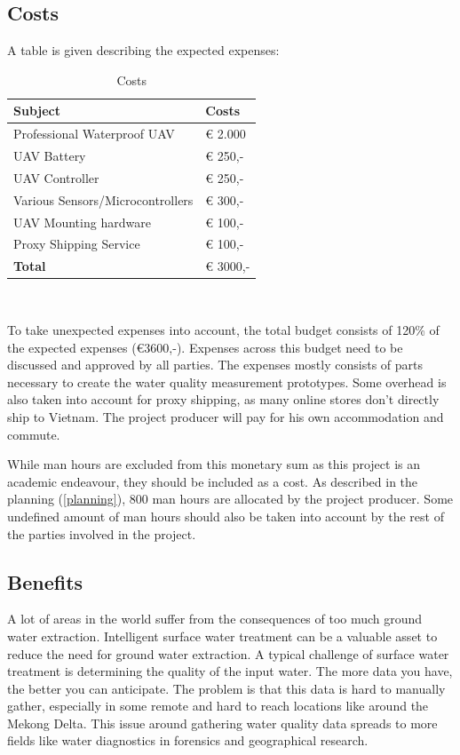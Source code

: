 \documentclass[11pt, a4paper]{article}
\begin{document}
\subsection{Costs}
A table is given describing the expected expenses:\\
\begin{table}[h]
    \centering
\begin{tabular}{ | l | l |}
    \hline
    \textbf{Subject} & \textbf{Costs} \\ \hline
    Professional Waterproof UAV & € 2.000 \\
    UAV Battery & € 250,- \\
    UAV Controller & € 250,- \\
    Various Sensors/Microcontrollers & € 300,- \\
    UAV Mounting hardware & € 100,- \\
    Proxy Shipping Service & € 100,- \\
    \hline
    \textbf{Total} & € 3000,- \\
    \hline
\end{tabular}\\
    \caption{Costs}
\end{table}



\begin{center}

\end{center}

To take unexpected expenses into account, the total budget consists of 120\% of the expected expenses (€3600,-). Expenses across this budget need to be discussed and approved by all parties. The expenses mostly consists of parts necessary to create the water quality measurement prototypes. Some overhead is also taken into account for proxy shipping, as many online stores don't directly ship to Vietnam. The project producer will pay for his own accommodation and commute.

While man hours are excluded from this monetary sum as this project is an academic endeavour, they should be included as a cost. As described in the planning (\ref{planning}), 800 man hours are allocated by the project producer. Some undefined amount of man hours should also be taken into account by the rest of the parties involved in the project.

\subsection{Benefits}
A lot of areas in the world suffer from the consequences of too much ground water extraction. Intelligent surface water treatment can be a valuable asset to reduce the need for ground water extraction. A typical challenge of surface water treatment is determining the quality of the input water. The more data you have, the better you can anticipate. The problem is that this data is hard to manually gather, especially in some remote and hard to reach locations like around the Mekong Delta. This issue around gathering water quality data spreads to more fields like water diagnostics in forensics and geographical research.
\end{document}
